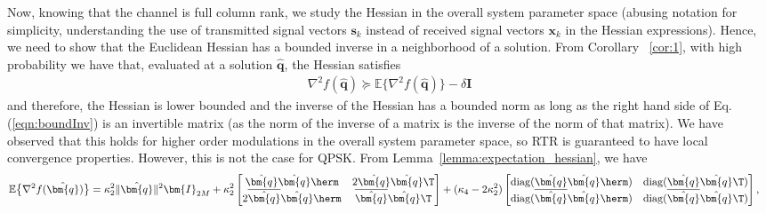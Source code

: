 Now, knowing that the channel is full column rank, we study the Hessian in the overall system parameter space (abusing notation for simplicity, understanding the use of transmitted signal vectors $\bm{s}_k$ instead of received signal vectors $\bm{x}_k$ in the Hessian expressions).
Hence, we need to show that the Euclidean Hessian has a bounded inverse in a neighborhood of a solution. From Corollary ~\ref{cor:1}, with high probability we have that, evaluated at a solution $\hat{\bm{q}}$, the Hessian satisfies
\begin{align}
\nabla^2f(\hat{\bm{q}})\succeq\mathbb{E}\{\nabla^2 f(\hat{\bm{q}})\}- \delta\bm{I} \label{eqn:boundInv}
\end{align}
and therefore, the Hessian is lower bounded and the inverse of the Hessian has a bounded norm as long as the right hand side of Eq.(\ref{eqn:boundInv}) is an invertible matrix (as the 
norm of the inverse of a matrix is the inverse of the norm of that matrix). We have observed that this holds for higher order modulations in the overall system parameter space, so RTR is guaranteed to have local convergence properties. However, this is not the case for QPSK. From Lemma~\ref{lemma:expectation_hessian}, we have
\begin{align}
\mathbb{E}\big\{\nabla^2f(\hat{\bm{q}})\big\}&=\kappa_2^2\|\hat{\bm{q}}\|^2\bm{I}_{2M}+\kappa_2^2\begin{bmatrix}
\hat{\bm{q}}\hat{\bm{q}}\herm & 2\hat{\bm{q}}\hat{\bm{q}}\T\\
2\overline{\hat{\bm{q}}}\hat{\bm{q}}\herm &\overline{\hat{\bm{q}}}\hat{\bm{q}}\T \\
\end{bmatrix}+(\kappa_4-2\kappa_2^2)\begin{bmatrix}
\mathrm{diag}(\hat{\bm{q}}\hat{\bm{q}}\herm) & \mathrm{diag}(\hat{\bm{q}}\hat{\bm{q}}\T)\\
\mathrm{diag}(\overline{\hat{\bm{q}}}\hat{\bm{q}}\herm) &\mathrm{diag}(\overline{\hat{\bm{q}}}\hat{\bm{q}}\T) \\
\end{bmatrix},
\end{align}
